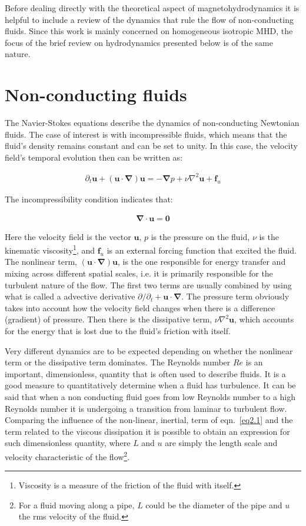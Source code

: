 \documentclass[12pt,a4paper]{report}
\begin{document}
Before dealing directly with the theoretical aspect of magnetohydrodynamics it is helpful to include a review of the dynamics that rule the flow of non-conducting fluids. Since this work is mainly concerned on homogeneous isotropic MHD, the focus of the brief review on hydrodynamics presented below is of the same nature. 

\section{Non-conducting fluids}

The Navier-Stokes equations describe the dynamics of non-conducting Newtonian fluids. The case of interest is with incompressible fluids, which means that the fluid's density remains constant and can be set to unity. In this case, the velocity field's temporal evolution then can be written as:

\begin{align}
 \partial_t \bm u + (\bm u \cdot \bm \nabla) \bm u = - \bm \nabla p + \nu \nabla^2 \bm u + \bm f_u
 \label{eq2.1}
\end{align}

The incompressibility condition indicates that: 

\begin{align}
 \bm \nabla \cdot \bm u = \bm 0
 \label{eq2.2}
\end{align}

Here the velocity field is the vector $\bm u$, $p$ is the pressure on the fluid, $\nu$ is the kinematic viscosity\footnote{Viscosity is a measure of the friction of the fluid with itself.}, and $\bm f_u$ is an external forcing function that excited the fluid. The nonlinear term, $(\bm u \cdot \bm \nabla) \bm u$, is the one responsible for energy transfer and mixing across different spatial scales, i.e. it is primarily responsible for the turbulent nature of the flow. The first two terms are usually combined by using what is called a advective derivative $\partial / \partial_t + \bm u \cdot \bm \nabla$. The pressure term obviously takes into account how the velocity field changes when there is a difference (gradient) of pressure. Then there is the dissipative term, $\nu \nabla^2 \bm u$, which accounts for the energy that is lost due to the fluid's friction with itself.

Very different dynamics are to be expected depending on whether the nonlinear term or the dissipative term dominates. The Reynolds number $Re$ is an important, dimensionless, quantity that is often used to describe fluids. It is a good measure to quantitatively determine when a fluid has turbulence. It can be said that when a non conducting fluid goes from low Reynolds number to a high Reynolds number it is undergoing a transition from laminar to turbulent flow. Comparing the influence of the non-linear, inertial, term of eqn.~\ref{eq2.1} and the term related to the viscous dissipation it is possible to obtain an expression for such dimensionless quantity, where $L$ and $u$ are simply the length scale and velocity characteristic of the flow\footnote{For a fluid moving along a pipe, $L$ could be the diameter of the pipe and $u$ the rms velocity of the fluid.}.
\end{document}
